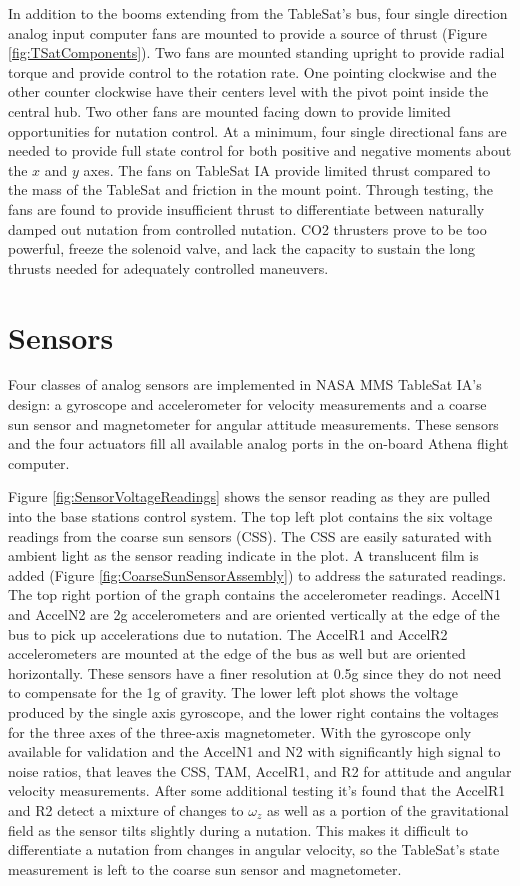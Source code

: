 In addition to the booms extending from the TableSat's bus, four single direction analog input computer fans are mounted to provide a source of thrust (Figure \ref{fig:TSatComponents}).  Two fans are mounted standing upright to provide radial torque and provide control to the rotation rate.  One pointing clockwise and the other counter clockwise have their centers level with the pivot point inside the central hub.  Two other fans are mounted facing down to provide limited opportunities for nutation control.  At a minimum, four single directional fans are needed to provide full state control for both positive and negative moments about the $x$ and $y$ axes.  The fans on TableSat IA provide limited thrust compared to the mass of the TableSat and friction in the mount point.  Through testing, the fans are found to provide insufficient thrust to differentiate between naturally damped out nutation from controlled nutation.  CO2 thrusters prove to be too powerful, freeze the solenoid valve, and lack the capacity to sustain the long thrusts needed for adequately controlled maneuvers.

\section{Sensors}
\label{sec:Sensors}

Four classes of analog sensors are implemented in NASA MMS TableSat IA's design: a gyroscope and accelerometer for velocity measurements and a coarse sun sensor and magnetometer for angular attitude measurements.  These sensors and the four actuators fill all available analog ports in the on-board Athena flight computer.

Figure \ref{fig:SensorVoltageReadings} shows the sensor reading as they are pulled into the base stations control system.  The top left plot contains the six voltage readings from the coarse sun sensors (CSS).  The CSS are easily saturated with ambient light as the sensor reading indicate in the plot.  A translucent film is added (Figure \ref{fig:CoarseSunSensorAssembly}) to address the saturated readings.  The top right portion of the graph contains the accelerometer readings.  AccelN1 and AccelN2 are 2g accelerometers and are oriented vertically at the edge of the bus to pick up accelerations due to nutation.  The AccelR1 and AccelR2 accelerometers are mounted at the edge of the bus as well but are oriented horizontally.  These sensors have a finer resolution at 0.5g since they do not need to compensate for the 1g of gravity.  The lower left plot shows the voltage produced by the single axis gyroscope, and the lower right contains the voltages for the three axes of the three-axis magnetometer.  With the gyroscope only available for validation and the AccelN1 and N2 with significantly high signal to noise ratios, that leaves the CSS, TAM, AccelR1, and R2 for attitude and angular velocity measurements.  After some additional testing it's found that the AccelR1 and R2 detect a mixture of changes to $\omega_z$ as well as a portion of the gravitational field as the sensor tilts slightly during a nutation.  This makes it difficult to differentiate a nutation from changes in angular velocity, so the TableSat's state measurement is left to the coarse sun sensor and magnetometer.

